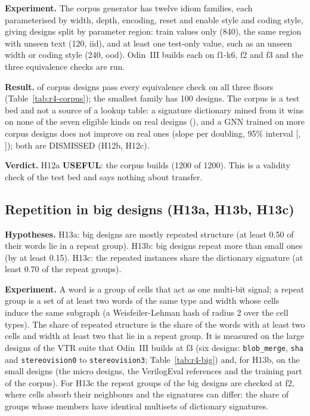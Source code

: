 \documentclass[conference]{IEEEtran}
\newcommand{\verdict}[1]{\textbf{\textsc{#1}}}
\newcommand{\hev}[1]{\par\smallskip\noindent\textbf{#1}}
\newcommand{\code}[1]{\texttt{#1}}
\begin{document}
\hev{Experiment.} The corpus generator has twelve idiom families, each parameterised by width, depth, encoding, reset and enable
style and coding style, giving \rfsCorpusTotal{} designs split by parameter region: train values only (840), the same region with
unseen text (120, iid), and at least one test-only value, such as an unseen width or coding style (240, ood). Odin~III builds each
on f1-k6, f2 and f3 and the three equivalence checks are run. %

\hev{Result.} \rfsCorpusOk{} of \rfsCorpusTotal{} corpus designs pass every equivalence check on all three floors
(Table~\ref{tab:r4-corpus}); the smallest family has 100 designs. The corpus is a test bed and not a source of a lookup table: a
signature dictionary mined from it wins on none of the seven eligible kinds on real designs (\rfsTwelveBVzeroNumbers), and a GNN
trained on more corpus designs does not improve on real ones (slope \rfsGnnSlope{} per doubling, 95\% interval
[\rfsGnnCiLo, \rfsGnnCiHi]); both are DISMISSED (H12b, H12c).



\hev{Verdict.} H12a \verdict{USEFUL}: the corpus builds (1200 of 1200). This is a validity check of the test bed and says
nothing about transfer.

\subsection{Repetition in big designs (H13a, H13b, H13c)}
\label{sec:repeat}

\hev{Hypotheses.} H13a: big designs are mostly repeated structure (at least 0.50 of their words lie in a repeat group). H13b:
big designs repeat more than small ones (by at least 0.15). H13c: the repeated instances share the dictionary signature (at
least 0.70 of the repeat groups).

\hev{Experiment.} A word is a group of cells that act as one multi-bit signal; a repeat group is a set of at least two words
of the same type and width whose cells induce the same subgraph (a Weisfeiler-Lehman hash of radius 2 over the cell types).
The share of repeated structure is the share of the words with at least two cells and width at least two that lie in a repeat
group. It is measured on the large designs of the VTR suite that Odin~III builds at f3 (six designs: \code{blob\_merge},
\code{sha} and \code{stereovision0} to \code{stereovision3}; Table~\ref{tab:r4-big}) and, for H13b, on the small designs
(the micro designs, the VerilogEval references and the training part of the corpus). For H13c the repeat groups of the big
designs are checked at f2, where cells absorb their neighbours and the signatures can differ: the share of groups whose members
have identical multisets of dictionary signatures. %
\end{document}
